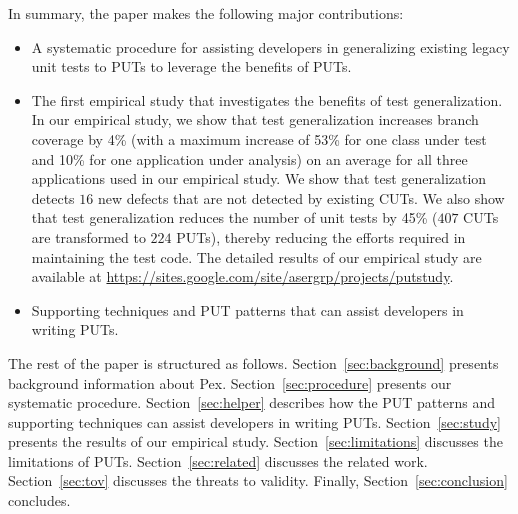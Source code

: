 In summary, the paper makes the following major contributions:
\begin{itemize}
	\item A systematic procedure for assisting developers in generalizing existing legacy unit tests to PUTs to leverage the benefits of PUTs.
	\item The first empirical study that investigates the benefits of test generalization. In our empirical study, we show that test generalization increases branch coverage by 4\% (with a maximum increase of 53\% for one class under test and 10\% for one application under analysis) on an average for all three applications used in our empirical study. We show that test generalization detects $16$ new defects that are not detected by existing CUTs. We also show that test generalization reduces the number of unit tests by 45\% ($407$ CUTs are transformed to $224$ PUTs), thereby reducing the efforts required in maintaining the test code. The detailed results of our empirical study are available at \url{https://sites.google.com/site/asergrp/projects/putstudy}.	
	\item Supporting techniques and PUT patterns that can assist developers in writing PUTs.
\end{itemize}

The rest of the paper is structured as follows. 
Section~\ref{sec:background} presents background information about Pex. Section~\ref{sec:procedure} presents our systematic procedure.  
Section~\ref{sec:helper} describes how the PUT patterns and supporting techniques can assist developers in writing PUTs. 
Section~\ref{sec:study} presents the results of our empirical study. Section~\ref{sec:limitations} discusses the limitations of PUTs. Section~\ref{sec:related} discusses the related work. Section~\ref{sec:tov} discusses the threats to validity. Finally, Section~\ref{sec:conclusion} concludes.

